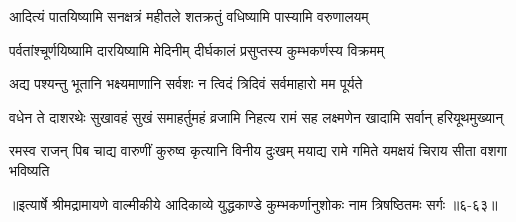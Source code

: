 \twolineshloka
{आदित्यं पातयिष्यामि सनक्षत्रं महीतले}
{शतक्रतुं वधिष्यामि पास्यामि वरुणालयम्} %

\twolineshloka
{पर्वतांश्चूर्णयिष्यामि दारयिष्यामि मेदिनीम्}
{दीर्घकालं प्रसुप्तस्य कुम्भकर्णस्य विक्रमम्} %

\twolineshloka
{अद्य पश्यन्तु भूतानि भक्ष्यमाणानि सर्वशः}
{न त्विदं त्रिदिवं सर्वमाहारो मम पूर्यते} %

\twolineshloka
{वधेन ते दाशरथेः सुखावहं सुखं समाहर्तुमहं व्रजामि}
{निहत्य रामं सह लक्ष्मणेन खादामि सर्वान् हरियूथमुख्यान्} %

\twolineshloka
{रमस्व राजन् पिब चाद्य वारुणीं कुरुष्व कृत्यानि विनीय दुःखम्}
{मयाद्य रामे गमिते यमक्षयं चिराय सीता वशगा भविष्यति} %


॥इत्यार्षे श्रीमद्रामायणे वाल्मीकीये आदिकाव्ये युद्धकाण्डे कुम्भकर्णानुशोकः नाम त्रिषष्ठितमः सर्गः ॥६-६३॥
